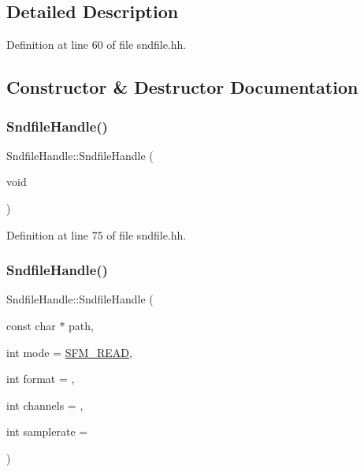 \subsection{Detailed Description}


Definition at line 60 of file sndfile.\+hh.



\subsection{Constructor \& Destructor Documentation}
\mbox{\label{class_sndfile_handle_a90b0e918f3531329dfb4ab0988187add}} 
\subsubsection{\texorpdfstring{SndfileHandle()}{SndfileHandle()}\hspace{0.1cm}{\footnotesize\ttfamily [1/6]}}
{\footnotesize\ttfamily Sndfile\+Handle\+::\+Sndfile\+Handle (\begin{DoxyParamCaption}\item[{void}]{ }\end{DoxyParamCaption})\hspace{0.3cm}{\ttfamily [inline]}}



Definition at line 75 of file sndfile.\+hh.

\mbox{\label{class_sndfile_handle_a60e5ec8dac736c5f3a2fdc95e7e9c70e}} 
\subsubsection{\texorpdfstring{SndfileHandle()}{SndfileHandle()}\hspace{0.1cm}{\footnotesize\ttfamily [2/6]}}
{\footnotesize\ttfamily Sndfile\+Handle\+::\+Sndfile\+Handle (\begin{DoxyParamCaption}\item[{const char $\ast$}]{path,  }\item[{int}]{mode = {\ttfamily \mbox{\hyperlink{sndfile_8h_adc29c2ff13d900c2f185ee95427fb06ca125531fe9c895237bccd35736370e815}{S\+F\+M\+\_\+\+R\+E\+AD}}},  }\item[{int}]{format = {},  }\item[{int}]{channels = {},  }\item[{int}]{samplerate = {} }\end{DoxyParamCaption})\hspace{0.3cm}{\ttfamily [inline]}}



